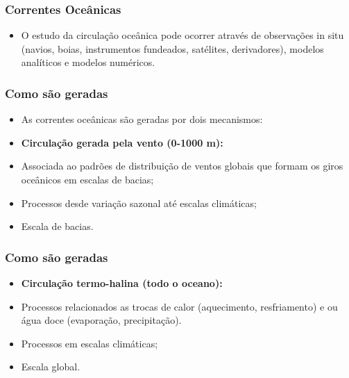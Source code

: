 \begin{frame}
\frametitle{Correntes Oceânicas}
  \begin{itemize}[<+-| alert@+>]
    \item O estudo da circulação oceânica pode ocorrer através de observações
          in situ (navios, boias, instrumentos fundeados, satélites,
          derivadores), modelos analíticos e modelos numéricos.
  \end{itemize}
\end{frame}


\begin{frame}
\frametitle{Como são geradas}
  \begin{itemize}[<+-| alert@+>]
    \item As correntes oceânicas são geradas por dois mecanismos:
    \item {\bf Circulação gerada pela vento (0-1000 m):}
    \item Associada ao padrões de distribuição de ventos globais que formam os
          giros oceânicos em escalas de bacias;
    \item Processos desde variação sazonal até escalas climáticas;
    \item Escala de bacias.
   \end{itemize}
\end{frame}


\begin{frame}
\frametitle{Como são geradas}
  \begin{itemize}[<+-| alert@+>]
    \item {\bf Circulação termo-halina (todo o oceano):}
    \item Processos relacionados as trocas de calor (aquecimento, resfriamento)
          e ou água doce (evaporação, precipitação).
    \item Processos em escalas climáticas;
    \item Escala global.
   \end{itemize}
\end{frame}

